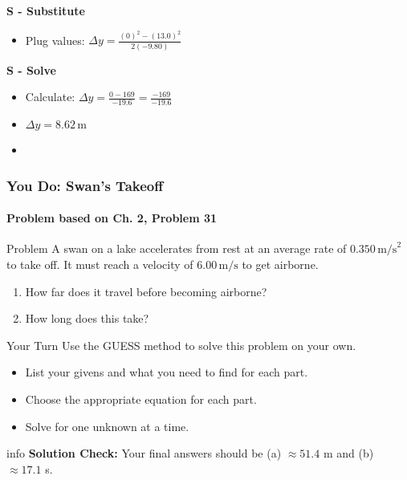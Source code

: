 \documentclass{beamer}
\begin{document}
\begin{frame}
\textbf{S - Substitute}
\begin{itemize}
    \item Plug values: $\Delta y = \frac{(0)^2 - (13.0)^2}{2(-9.80)}$
\end{itemize}
\pause
\textbf{S - Solve}
\begin{itemize}
    \item Calculate: $\Delta y = \frac{0 - 169}{-19.6} = \frac{-169}{-19.6}$
    \item $\Delta y = 8.62 \, \text{m}$
    \item {}
\end{itemize}
\end{frame}

\begin{frame}
\frametitle{You Do: Swan's Takeoff}
\framesubtitle{Problem based on Ch. 2, Problem 31}
\begin{block}{Problem}
A swan on a lake accelerates from rest at an average rate of $0.350 \, \text{m/s}^2$ to take off. It must reach a velocity of $6.00 \, \text{m/s}$ to get airborne.
\end{block}
\begin{enumerate}
    \item How far does it travel before becoming airborne?
    \item How long does this take?
\end{enumerate}

\begin{block}{Your Turn}
    Use the GUESS method to solve this problem on your own.
    \begin{itemize}
        \item List your givens and what you need to find for each part.
        \item Choose the appropriate equation for each part.
        \item Solve for one unknown at a time.
    \end{itemize}
\end{block}

\pause

\begin{beamercolorbox}[rounded=true,shadow=true]{info}
\centering
\textbf{Solution Check:} Your final answers should be (a) $\approx 51.4$ m and (b) $\approx 17.1$ s.
\end{beamercolorbox}

\end{frame}
\end{document}
